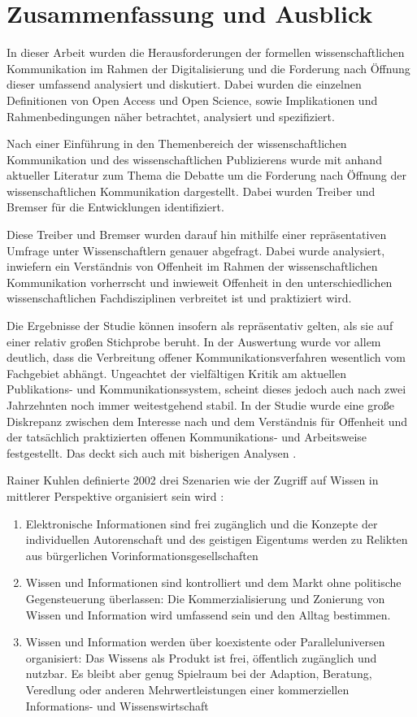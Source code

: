 \chapter{Zusammenfassung und Ausblick}

In dieser Arbeit wurden die Herausforderungen der formellen wissenschaftlichen Kommunikation im Rahmen der Digitalisierung und die Forderung nach Öffnung dieser umfassend analysiert und diskutiert. Dabei wurden die einzelnen Definitionen von Open Access und Open Science, sowie Implikationen und Rahmenbedingungen näher betrachtet, analysiert und spezifiziert.

Nach einer Einführung in den Themenbereich der wissenschaftlichen Kommunikation und des wissenschaftlichen Publizierens wurde mit anhand aktueller Literatur zum Thema die Debatte um die Forderung nach Öffnung der wissenschaftlichen Kommunikation dargestellt. Dabei wurden Treiber und Bremser für die Entwicklungen identifiziert.

Diese Treiber und Bremser wurden darauf hin mithilfe einer repräsentativen Umfrage unter Wissenschaftlern genauer abgefragt. Dabei wurde analysiert, inwiefern ein Verständnis von Offenheit im Rahmen der wissenschaftlichen Kommunikation vorherrscht und inwieweit Offenheit in den unterschiedlichen wissenschaftlichen Fachdisziplinen verbreitet ist und praktiziert wird.

Die Ergebnisse der Studie können insofern als repräsentativ gelten, als sie auf einer relativ großen Stichprobe beruht. In der Auswertung wurde vor allem deutlich, dass die Verbreitung offener Kommunikationsverfahren wesentlich vom Fachgebiet abhängt. Ungeachtet der vielfältigen Kritik am aktuellen Publikations- und Kommunikationssystem, scheint dieses jedoch auch nach zwei Jahrzehnten noch immer weitestgehend stabil. In der Studie wurde eine große Diskrepanz zwischen dem Interesse nach und dem Verständnis für Offenheit und der tatsächlich praktizierten offenen Kommunikations- und Arbeitsweise festgestellt. Das deckt sich auch mit bisherigen Analysen \cite{Bartling_2013}.

Rainer Kuhlen definierte 2002 drei Szenarien wie der Zugriff auf Wissen in mittlerer Perspektive organisiert sein wird \cite{Kuhlen_2002_universalaccess}:
\begin{enumerate}
\item Elektronische Informationen sind frei zugänglich und die Konzepte der individuellen Autorenschaft und des geistigen Eigentums werden zu Relikten aus bürgerlichen Vorinformationsgesellschaften
\item Wissen und Informationen sind kontrolliert und dem Markt ohne politische Gegensteuerung überlassen: Die Kommerzialisierung und Zonierung von Wissen und Information wird umfassend sein und den Alltag bestimmen.
\item Wissen und Information werden über koexistente oder Paralleluniversen organisiert: Das Wissens als Produkt ist frei, öffentlich zugänglich und nutzbar. Es bleibt aber genug Spielraum bei der Adaption, Beratung, Veredlung oder anderen Mehrwertleistungen einer kommerziellen Informations- und Wissenswirtschaft
\end{enumerate}

